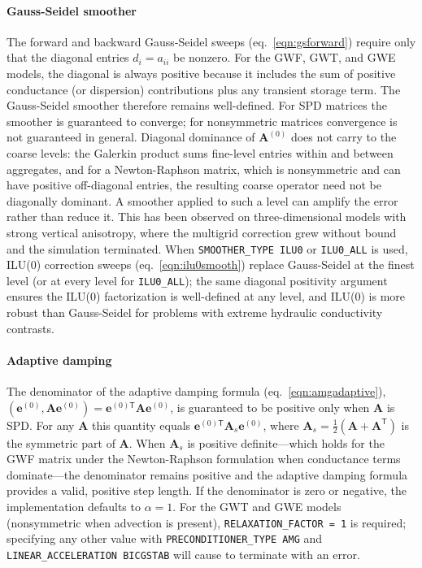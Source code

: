 \paragraph{Gauss-Seidel smoother}
The forward and backward Gauss-Seidel sweeps (eq.~\ref{eqn:gsforward}) require only that the diagonal entries $d_i = a_{ii}$ be nonzero. For the GWF, GWT, and GWE models, the diagonal is always positive because it includes the sum of positive conductance (or dispersion) contributions plus any transient storage term. The Gauss-Seidel smoother therefore remains well-defined. For SPD matrices the smoother is guaranteed to converge; for nonsymmetric matrices convergence is not guaranteed in general. Diagonal dominance of $\mathbf{A}^{(0)}$ does not carry to the coarse levels: the Galerkin product sums fine-level entries within and between aggregates, and for a Newton-Raphson matrix, which is nonsymmetric and can have positive off-diagonal entries, the resulting coarse operator need not be diagonally dominant. A smoother applied to such a level can amplify the error rather than reduce it. This has been observed on three-dimensional models with strong vertical anisotropy, where the multigrid correction grew without bound and the simulation terminated. When \texttt{SMOOTHER\_TYPE ILU0} or \texttt{ILU0\_ALL} is used, ILU(0) correction sweeps (eq.~\ref{eqn:ilu0smooth}) replace Gauss-Seidel at the finest level (or at every level for \texttt{ILU0\_ALL}); the same diagonal positivity argument ensures the ILU(0) factorization is well-defined at any level, and ILU(0) is more robust than Gauss-Seidel for problems with extreme hydraulic conductivity contrasts.

\paragraph{Adaptive damping}
The denominator of the adaptive damping formula (eq.~\ref{eqn:amgadaptive}), $(\mathbf{e}^{(0)}, \mathbf{A} \mathbf{e}^{(0)}) = \mathbf{e}^{(0)\mathsf{T}} \mathbf{A} \mathbf{e}^{(0)}$, is guaranteed to be positive only when $\mathbf{A}$ is SPD. For any $\mathbf{A}$ this quantity equals $\mathbf{e}^{(0)\mathsf{T}} \mathbf{A}_s \mathbf{e}^{(0)}$, where $\mathbf{A}_s = \frac{1}{2}(\mathbf{A} + \mathbf{A}^{\mathsf{T}})$ is the symmetric part of $\mathbf{A}$. When $\mathbf{A}_s$ is positive definite---which holds for the GWF matrix under the Newton-Raphson formulation when conductance terms dominate---the denominator remains positive and the adaptive damping formula provides a valid, positive step length. If the denominator is zero or negative, the implementation defaults to $\alpha = 1$. For the GWT and GWE models (nonsymmetric when advection is present), \texttt{RELAXATION\_FACTOR = 1} is required; specifying any other value with \texttt{PRECONDITIONER\_TYPE AMG} and \texttt{LINEAR\_ACCELERATION BICGSTAB} will cause \mf to terminate with an error.

